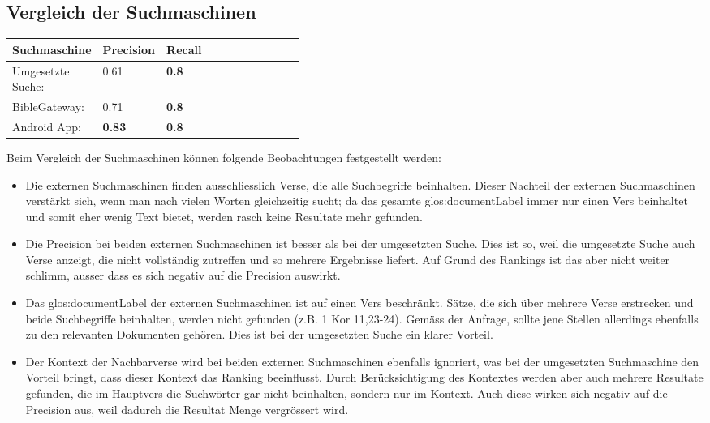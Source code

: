 \newpage
\subsection{Vergleich der Suchmaschinen}
\begin{table}[H]
	\centering
	\small\renewcommand{\arraystretch}{1.4}
	\begin{tabularx}{0.9\textwidth}{ L{0.22\linewidth} | L{0.2\linewidth} | X }%
		\hline
		\textbf{Suchmaschine} & \textbf{Precision} & \textbf{Recall} \\ \hline \hline
		Umgesetzte Suche: & 0.61 & \textbf{0.8}\\
		BibleGateway: & 0.71  & \textbf{0.8}\\
		Android App: & \textbf{0.83} & \textbf{0.8}\\
		\hline
	\end{tabularx}
\end{table}

Beim Vergleich der Suchmaschinen können folgende Beobachtungen festgestellt werden:
\begin{itemize}[noitemsep]
	\item Die externen Suchmaschinen finden ausschliesslich Verse, die alle Suchbegriffe beinhalten.
	Dieser Nachteil der externen Suchmaschinen verstärkt sich, wenn man nach vielen Worten gleichzeitig sucht; da das gesamte \gls{glos:documentLabel} immer nur einen Vers beinhaltet und somit eher wenig Text bietet, werden rasch keine Resultate mehr gefunden.
	
	\item Die Precision bei beiden externen Suchmaschinen ist besser als bei der umgesetzten Suche.
	Dies ist so, weil die umgesetzte Suche auch Verse anzeigt, die nicht vollständig zutreffen und so mehrere Ergebnisse liefert. Auf Grund des Rankings ist das aber nicht weiter schlimm, ausser dass es sich negativ auf die Precision auswirkt.
	
	\item Das \gls{glos:documentLabel} der externen Suchmaschinen ist auf einen Vers beschränkt. Sätze, die sich über mehrere Verse erstrecken und beide Suchbegriffe beinhalten, werden nicht gefunden (z.B. 1 Kor 11,23-24).
	Gemäss der Anfrage, sollte jene Stellen allerdings ebenfalls zu den relevanten Dokumenten gehören.
	Dies ist bei der umgesetzten Suche ein klarer Vorteil.
	
	\item Der Kontext der Nachbarverse wird bei beiden externen Suchmaschinen ebenfalls ignoriert, was bei der umgesetzten Suchmaschine den Vorteil bringt, dass dieser Kontext das Ranking beeinflusst.
	Durch Berücksichtigung des Kontextes werden aber auch mehrere Resultate gefunden, die im Hauptvers die Suchwörter gar nicht beinhalten, sondern nur im Kontext.
	Auch diese wirken sich negativ auf die Precision aus, weil dadurch die Resultat Menge vergrössert wird.
	
\end{itemize}


